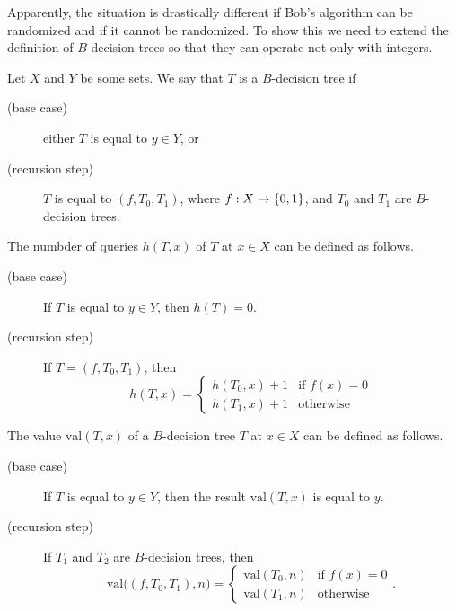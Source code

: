Apparently, the situation is drastically different if Bob's algorithm can be
randomized and if it cannot be randomized.
To show this we need to extend the definition of $B$-decision trees so that they
can operate not only with integers.
\begin{definition}
  Let $X$ and $Y$ be some sets. We say that $T$ is a $B$-decision tree if
  \begin{description}
    \item [(base case)] either $T$ is equal to $y \in Y$, or
    \item [(recursion step)] $T$ is equal to $(f, T_0, T_1)$,
      where $f : X \to \set{0, 1}$, and $T_0$ and $T_1$
      are $B$-decision trees.
  \end{description}

  The numbder of queries $h(T, x)$ of $T$ at $x \in X$ can be defined as follows.
  \begin{description}
    \item [(base case)] If $T$ is equal to $y \in Y$, then $h(T) = 0$.
    \item[(recursion step)] If $T = (f, T_0, T_1)$, then
      \[
          h(T, x) = 
          \begin{cases}
            h(T_0, x) + 1 & \text{if } f(x) = 0 \\
            h(T_1, x) + 1 & \text{otherwise}
          \end{cases}
      \]
  \end{description}

  The value $\mathrm{val}(T, x)$ of a $B$-decision tree $T$ at $x \in X$
  can be defined as follows.
  \begin{description}
      \item [(base case)] If $T$ is equal to $y \in Y$,
        then the result $\mathrm{val}(T, x)$ is equal to $y$.
      \item[(recursion step)] If $T_1$ and $T_2$ are $B$-decision trees, then
        \[
          \mathrm{val}\Big((f, T_0, T_1), n\Big) =
          \begin{cases}
            \mathrm{val}(T_0, n) & \text{if } f(x) = 0 \\
            \mathrm{val}(T_1, n) & \text{otherwise}
          \end{cases}.
        \]
  \end{description}
\end{definition}

